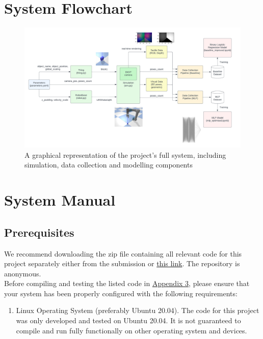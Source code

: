 \documentclass[11pt, a4paper]{report}
\begin{document}
 

\appendix
\printbibliography

\chapter{System Flowchart}\label{apdx:1}
\begin{figure}[H]
    \centering
    \includegraphics[width=\textwidth]{docs/Project Report/Media/appendix_project_architecture.png}
    \caption{A graphical representation of the project's full system, including simulation, data collection and modelling components}
    \label{fig:apdx1}
\end{figure}


\chapter{System Manual}\label{apdx:2}
\section{Prerequisites}\label{apdx:2.1}
We recommend downloading the zip file containing all relevant code for this project separately either from the submission or \hyperref[]{this link}. The repository is anonymous.\\

Before compiling and testing the listed code in \hyperref[apdx:3]{Appendix 3}, please ensure that your system has been properly configured with the following requirements:
\begin{enumerate}
    \item Linux Operating System (preferably Ubuntu 20.04). The code for this project was only developed and tested on Ubuntu 20.04. It is not guaranteed to compile and run fully functionally on other operating system and devices.
\end{enumerate}
\end{document}
